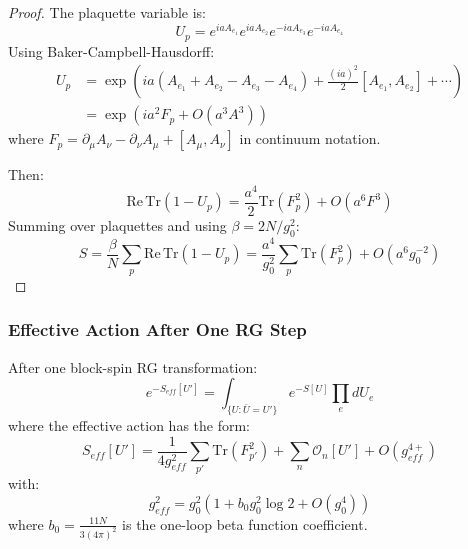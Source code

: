 \begin{proof}
The plaquette variable is:
\begin{equation}
U_p = e^{iaA_{e_1}} e^{iaA_{e_2}} e^{-iaA_{e_3}} e^{-iaA_{e_4}}
\end{equation}
Using Baker-Campbell-Hausdorff:
\begin{align}
U_p &= \exp\left(ia(A_{e_1} + A_{e_2} - A_{e_3} - A_{e_4}) + \frac{(ia)^2}{2}[A_{e_1}, A_{e_2}] + \cdots\right) \\
&= \exp(ia^2 F_p + O(a^3 A^3))
\end{align}
where $F_p = \partial_\mu A_\nu - \partial_\nu A_\mu + [A_\mu, A_\nu]$ in continuum notation.

Then:
\begin{equation}
\mathrm{Re}\,\mathrm{Tr}(1 - U_p) = \frac{a^4}{2} \mathrm{Tr}(F_p^2) + O(a^6 F^3)
\end{equation}
Summing over plaquettes and using $\beta = 2N/g_0^2$:
\begin{equation}
S = \frac{\beta}{N} \sum_p \mathrm{Re}\,\mathrm{Tr}(1 - U_p) = \frac{a^4}{g_0^2} \sum_p \mathrm{Tr}(F_p^2) + O(a^6 g_0^{-2})
\end{equation}
\end{proof}

\subsubsection{Effective Action After One RG Step}

\begin{theorem}
\label{thm:one_step_rg}
After one block-spin RG transformation:
\begin{equation}
e^{-S_{eff}[U']} = \int_{\{U : \bar{U} = U'\}} e^{-S[U]} \prod_e dU_e
\end{equation}
where the effective action has the form:
\begin{equation}
S_{eff}[U'] = \frac{1}{4g_{eff}^2} \sum_{p'} \mathrm{Tr}(F_{p'}^2) + \sum_n \mathcal{O}_n[U'] + O(g_{eff}^{4+})
\end{equation}
with:
\begin{equation}
g_{eff}^2 = g_0^2 \left(1 + b_0 g_0^2 \log 2 + O(g_0^4)\right)
\end{equation}
where $b_0 = \frac{11N}{3(4\pi)^2}$ is the one-loop beta function coefficient.
\end{theorem}

